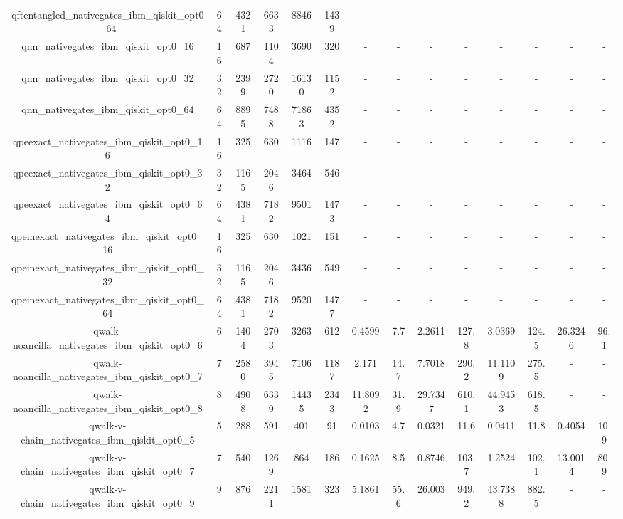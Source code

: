 \begin{table}[htb]
{\begin{tabular}{|c|c|c|c|c|c|c|c|c|c|c|c|c|c|}
qftentangled\_nativegates\_ibm\_qiskit\_opt0\_64 & 64 & 4321 & 6633 & 8846 & 1439 & - & - & - & - & - & - & - & - \\ 
qnn\_nativegates\_ibm\_qiskit\_opt0\_16 & 16 & 687 & 1104 & 3690 & 320 & - & - & - & - & - & - & - & - \\ 
qnn\_nativegates\_ibm\_qiskit\_opt0\_32 & 32 & 2399 & 2720 & 16130 & 1152 & - & - & - & - & - & - & - & - \\ 
qnn\_nativegates\_ibm\_qiskit\_opt0\_64 & 64 & 8895 & 7488 & 71863 & 4352 & - & - & - & - & - & - & - & - \\ 
qpeexact\_nativegates\_ibm\_qiskit\_opt0\_16 & 16 & 325 & 630 & 1116 & 147 & - & - & - & - & - & - & - & - \\ 
qpeexact\_nativegates\_ibm\_qiskit\_opt0\_32 & 32 & 1165 & 2046 & 3464 & 546 & - & - & - & - & - & - & - & - \\ 
qpeexact\_nativegates\_ibm\_qiskit\_opt0\_64 & 64 & 4381 & 7182 & 9501 & 1473 & - & - & - & - & - & - & - & - \\ 
qpeinexact\_nativegates\_ibm\_qiskit\_opt0\_16 & 16 & 325 & 630 & 1021 & 151 & - & - & - & - & - & - & - & - \\ 
qpeinexact\_nativegates\_ibm\_qiskit\_opt0\_32 & 32 & 1165 & 2046 & 3436 & 549 & - & - & - & - & - & - & - & - \\ 
qpeinexact\_nativegates\_ibm\_qiskit\_opt0\_64 & 64 & 4381 & 7182 & 9520 & 1477 & - & - & - & - & - & - & - & - \\ 
qwalk-noancilla\_nativegates\_ibm\_qiskit\_opt0\_6 & 6 & 1404 & 2703 & 3263 & 612 & 0.4599 & 7.7 & 2.2611 & 127.8 & 3.0369 & 124.5 & 26.3246 & 96.1 \\ 
qwalk-noancilla\_nativegates\_ibm\_qiskit\_opt0\_7 & 7 & 2580 & 3945 & 7106 & 1187 & 2.171 & 14.7 & 7.7018 & 290.2 & 11.1109 & 275.5 & - & - \\ 
qwalk-noancilla\_nativegates\_ibm\_qiskit\_opt0\_8 & 8 & 4908 & 6339 & 14435 & 2343 & 11.8092 & 31.9 & 29.7347 & 610.1 & 44.9453 & 618.5 & - & - \\ 
qwalk-v-chain\_nativegates\_ibm\_qiskit\_opt0\_5 & 5 & 288 & 591 & 401 & 91 & 0.0103 & 4.7 & 0.0321 & 11.6 & 0.0411 & 11.8 & 0.4054 & 10.9 \\ 
qwalk-v-chain\_nativegates\_ibm\_qiskit\_opt0\_7 & 7 & 540 & 1269 & 864 & 186 & 0.1625 & 8.5 & 0.8746 & 103.7 & 1.2524 & 102.1 & 13.0014 & 80.9 \\ 
qwalk-v-chain\_nativegates\_ibm\_qiskit\_opt0\_9 & 9 & 876 & 2211 & 1581 & 323 & 5.1861 & 55.6 & 26.003 & 949.2 & 43.7388 & 882.5 & - & - \\ 

\end{tabular}}
\end{table}
